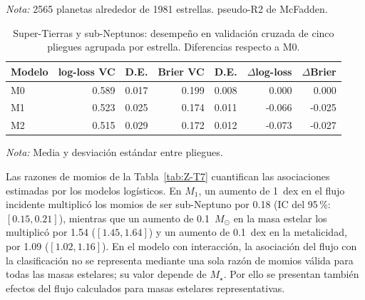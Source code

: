 \begin{table}[htbp]
    \centering
    \caption{Super-Tierras y sub-Neptunos: comparación de los modelos logísticos en la muestra de ajuste. Diferencias respecto a M0.}
    \label{tab:Z-T3}
    \small
    \par\smallskip
    {\footnotesize\textit{Nota:} 2565 planetas alrededor de 1981 estrellas. pseudo-R2 de McFadden.}
\end{table}

\begin{table}[htbp]
    \centering
    \caption{Super-Tierras y sub-Neptunos: desempeño en validación cruzada de cinco pliegues agrupada por estrella. Diferencias respecto a M0.}
    \label{tab:Z-T5}
    \small
    \begin{tabular}{lrrrrrr}
    \toprule
    Modelo & log-loss VC & D.E. & Brier VC & D.E. & $\Delta$log-loss & $\Delta$Brier \\
    \midrule
    M0 & 0.589 & 0.017 & 0.199 & 0.008 & 0.000 & 0.000 \\
    M1 & 0.523 & 0.025 & 0.174 & 0.011 & -0.066 & -0.025 \\
    M2 & 0.515 & 0.029 & 0.172 & 0.012 & -0.073 & -0.027 \\
    \bottomrule
    \end{tabular}
    \par\smallskip
    {\footnotesize\textit{Nota:} Media y desviación estándar entre pliegues.}
\end{table}

Las razones de momios de la Tabla~\ref{tab:Z-T7} cuantifican las asociaciones estimadas por los modelos logísticos. En $M_1$, un aumento de 1~dex en el flujo incidente multiplicó los momios de ser sub-Neptuno por 0.18 (IC del 95\,\%: $[0.15, 0.21]$), mientras que un aumento de 0.1~$M_\odot$ en la masa estelar los multiplicó por 1.54 ($[1.45, 1.64]$) y un aumento de 0.1~dex en la metalicidad, por 1.09 ($[1.02, 1.16]$). En el modelo con interacción, la asociación del flujo con la clasificación no se representa mediante una sola razón de momios válida para todas las masas estelares; su valor depende de $M_\star$. Por ello se presentan también efectos del flujo calculados para masas estelares representativas.

